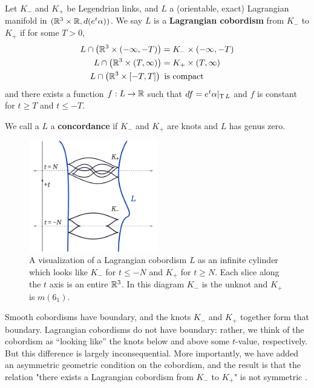 \begin{definition}
    Let $K_-$ and $K_+$ be Legendrian links, and $L$ a (orientable, exact) Lagrangian manifold in $(\mathbb{R}^3 \times \mathbb{R}, d(e^t \alpha))$. We say $L$ is a \textbf{Lagrangian cobordism} from $K_-$ to $K_+$ if for some $T > 0$,
    \begin{align*}
        L \cap \left(\mathbb{R}^3 \times (-\infty, -T)\right) &= K_- \times (-\infty, -T)\\
        L \cap \left(\mathbb{R}^3 \times (T, \infty)\right) &= K_+ \times (T, \infty)\\
        L \cap \left(\mathbb{R}^3 \times [-T, T] \right)\, &\,\, \text{is compact}
    \end{align*}
    and there exists a function $f: L \to \mathbb{R}$ such that ${df = e^t \alpha |_{\operatorname{T} L}}$ and $f$ is constant for $t \geq T$ and $t \leq -T$.

    We call a $L$ a \textbf{concordance} if $K_-$ and $K_+$ are knots and $L$ has genus zero.

\end{definition}

\begin{figure}[ht]
    \centering
    \includegraphics[width=0.5\textwidth]{images/cobordism-visualization.pdf}
    \caption{A visualization of a Lagrangian cobordism $L$ as an infinite cylinder which looks like $K_-$ for $t \leq -N$ and $K_+$ for $t \geq N$. Each slice along the $t$ axis is an entire $\mathbb{R}^3$. In this diagram $K_-$ is the unknot and $K_+$ is $m(6_1)$.}%
    \label{fig:cobordism-vis}
\end{figure}

Smooth cobordisms have boundary, and the knots $K_-$ and $K_+$ together form that boundary. Lagrangian cobordisms do not have boundary: rather, we think of the cobordism as ``looking like'' the knots below and above some $t$-value, respectively.
But this difference is largely inconsequential.
More importantly, we have added an asymmetric geometric condition on the cobordism, and the result is that the relation "there exists a Lagrangian cobordism from $K_-$ to $K_+$" is not symmetric \cite{chantraine2015}.

